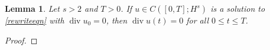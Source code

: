 \documentclass[11pt]{amsart}
\numberwithin{equation}{section}
\newtheorem{lemma}[theorem]{Lemma}
\begin{document}
	\begin{lemma}\label{lemma_div}
		Let $s > 2$ and $T > 0$. If $u \in C([0,T];H^s)$ is a solution to \eqref{rewriteeqn} with  $\operatorname{div} u_0 = 0$, then 
		$\operatorname{div} u(t) = 0$ for all $0\le t\le T$.
	\end{lemma}
	\begin{proof}
		

\end{proof}
\end{document}
